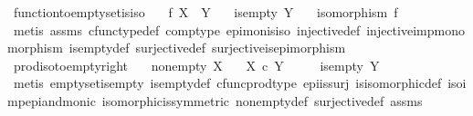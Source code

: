 \begin{isabellebody}
\endisatagproof
{\isafoldproof}%
%
\isadelimproof
\isanewline
%
\endisadelimproof
\isanewline
{}\isamarkupfalse%
\ function{\isacharunderscore}{\kern0pt}to{\isacharunderscore}{\kern0pt}empty{\isacharunderscore}{\kern0pt}set{\isacharunderscore}{\kern0pt}is{\isacharunderscore}{\kern0pt}iso{\isacharcolon}{\kern0pt}\isanewline
\ \ \ {\isachardoublequoteopen}f{\isacharcolon}{\kern0pt}\ X\ {\isasymrightarrow}\ Y{\isachardoublequoteclose}\isanewline
\ \ \ {\isachardoublequoteopen}is{\isacharunderscore}{\kern0pt}empty\ Y{\isachardoublequoteclose}\isanewline
\ \ \ {\isachardoublequoteopen}isomorphism\ f{\isachardoublequoteclose}\isanewline
%
\isadelimproof
\ \ %
\endisadelimproof
%
\isatagproof
{}\isamarkupfalse%
\ {\isacharparenleft}{\kern0pt}metis\ assms\ cfunc{\isacharunderscore}{\kern0pt}type{\isacharunderscore}{\kern0pt}def\ comp{\isacharunderscore}{\kern0pt}type\ epi{\isacharunderscore}{\kern0pt}mon{\isacharunderscore}{\kern0pt}is{\isacharunderscore}{\kern0pt}iso\ injective{\isacharunderscore}{\kern0pt}def\ injective{\isacharunderscore}{\kern0pt}imp{\isacharunderscore}{\kern0pt}monomorphism\ is{\isacharunderscore}{\kern0pt}empty{\isacharunderscore}{\kern0pt}def\ surjective{\isacharunderscore}{\kern0pt}def\ surjective{\isacharunderscore}{\kern0pt}is{\isacharunderscore}{\kern0pt}epimorphism{\isacharparenright}{\kern0pt}%
\endisatagproof
{\isafoldproof}%
%
\isadelimproof
\isanewline
%
\endisadelimproof
\isanewline
{}\isamarkupfalse%
\ prod{\isacharunderscore}{\kern0pt}iso{\isacharunderscore}{\kern0pt}to{\isacharunderscore}{\kern0pt}empty{\isacharunderscore}{\kern0pt}right{\isacharcolon}{\kern0pt}\isanewline
\ \ \ {\isachardoublequoteopen}nonempty\ X{\isachardoublequoteclose}\isanewline
\ \ \ {\isachardoublequoteopen}X\ {\isasymtimes}\isactrlsub c\ Y\ {\isasymcong}\ {\isasymemptyset}{\isachardoublequoteclose}\isanewline
\ \ \ {\isachardoublequoteopen}is{\isacharunderscore}{\kern0pt}empty\ Y{\isachardoublequoteclose}\isanewline
%
\isadelimproof
\ \ %
\endisadelimproof
%
\isatagproof
{}\isamarkupfalse%
\ {\isacharparenleft}{\kern0pt}metis\ emptyset{\isacharunderscore}{\kern0pt}is{\isacharunderscore}{\kern0pt}empty\ is{\isacharunderscore}{\kern0pt}empty{\isacharunderscore}{\kern0pt}def\ cfunc{\isacharunderscore}{\kern0pt}prod{\isacharunderscore}{\kern0pt}type\ epi{\isacharunderscore}{\kern0pt}is{\isacharunderscore}{\kern0pt}surj\ is{\isacharunderscore}{\kern0pt}isomorphic{\isacharunderscore}{\kern0pt}def\ iso{\isacharunderscore}{\kern0pt}imp{\isacharunderscore}{\kern0pt}epi{\isacharunderscore}{\kern0pt}and{\isacharunderscore}{\kern0pt}monic\ isomorphic{\isacharunderscore}{\kern0pt}is{\isacharunderscore}{\kern0pt}symmetric\ nonempty{\isacharunderscore}{\kern0pt}def\ surjective{\isacharunderscore}{\kern0pt}def{}\ assms{\isacharparenright}{\kern0pt}%

\end{isabellebody}

